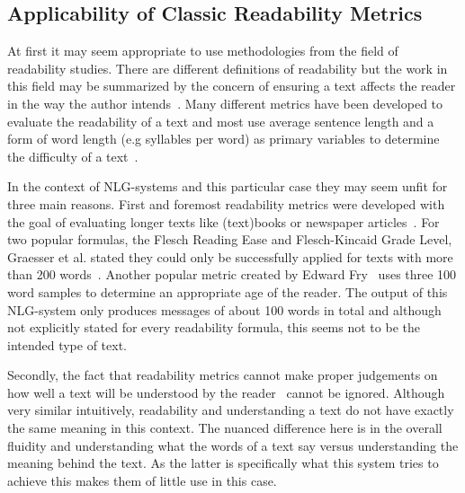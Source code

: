 \documentclass[sigconf,obeyspaces]{acmart}
\begin{document}
\subsection{Applicability of Classic Readability Metrics}
At first it may seem appropriate to use methodologies from the field of readability studies. There are different definitions of readability but the work in this field may be summarized by the concern of ensuring a text affects the reader in the way the author intends~\cite[1]{Zamanian_Heydari}. Many different metrics have been developed to evaluate the readability of a text and most use average sentence length and a form of word length (e.g syllables per word) as primary variables to determine the difficulty of a text~\cite[2\psqq]{Zamanian_Heydari}.

In the context of NLG-systems and this particular case they may seem unfit for three main reasons. First and foremost readability metrics were developed with the goal of evaluating longer texts like (text)books or newspaper articles~\cite{Zamanian_Heydari}. For two popular formulas, the Flesch Reading Ease and Flesch-Kincaid Grade Level, Graesser et al. stated they could only be successfully applied for texts with more than 200 words~\cite[7]{Graesser}. Another popular metric created by Edward Fry~\cite{Fry} uses three 100 word samples to determine an appropriate age of the reader. The output of this NLG-system only produces messages of about 100 words in total and although not explicitly stated for every readability formula, this seems not to be the intended type of text.

Secondly, the fact that readability metrics cannot make proper judgements on how well a text will be understood by the reader~\cite[9]{Zamanian_Heydari} cannot be ignored. Although very similar intuitively, readability and understanding a text do not have exactly the same meaning in this context. The nuanced difference here is in the overall fluidity and understanding what the words of a text say versus understanding the meaning behind the text. As the latter is specifically what this system tries to achieve this makes them of little use in this case.
\end{document}
